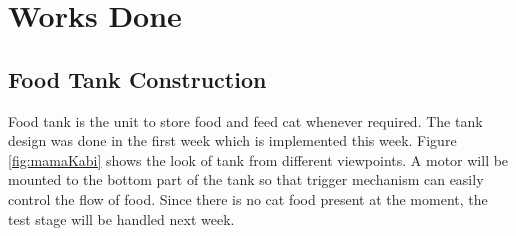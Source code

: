\section{Works Done}
\label{sec:worksDone}
\subsection{Food Tank Construction}
Food tank is the unit to store food and feed cat whenever required. The tank design was done in the first week which is implemented this week. Figure \ref{fig:mamaKabi} shows the look of tank from different viewpoints. A motor will be mounted to the bottom part of the tank so that trigger mechanism can easily control the flow of food. Since there is no cat food present at the moment, the test stage will be handled next week.

